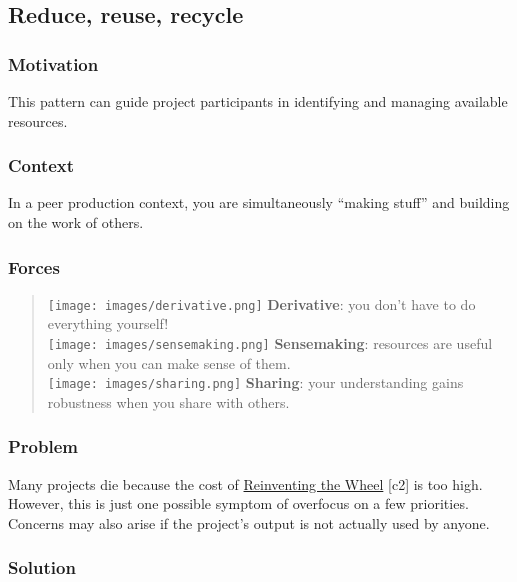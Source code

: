 \hypertarget{reduce-reuse-recycle}{%
\subsection{Reduce, reuse, recycle}\label{reduce-reuse-recycle}}

\hypertarget{motivation}{%
\subsubsection{Motivation}\label{motivation}}

This pattern can guide project participants in identifying and managing
available resources.

\hypertarget{context}{%
\subsubsection{Context}\label{context}}

In a peer production context, you are simultaneously ``making stuff''
and building on the work of others.

\hypertarget{forces}{%
\subsubsection{Forces}\label{forces}}

\begin{quote}
\texttt{[image: images/derivative.png]} \textbf{Derivative}: you don't
have to do everything yourself!\\
\texttt{[image: images/sensemaking.png]} \textbf{Sensemaking}: resources
are useful only when you can make sense of them.\\
\texttt{[image: images/sharing.png]} \textbf{Sharing}: your
understanding gains robustness when you share with others.
\end{quote}

\hypertarget{problem}{%
\subsubsection{Problem}\label{problem}}

Many projects die because the cost of
{{\href{http://c2.com/cgi/wiki?ReinventingTheWheel}{Reinventing the
Wheel}}} {[}c2{]} is too high. However, this is just one possible
symptom of overfocus on a few priorities. Concerns may also arise if the
project's output is not actually used by anyone.

\hypertarget{solution}{%
\subsubsection{Solution}\label{solution}}

